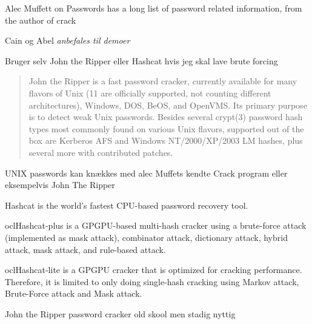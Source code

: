 \documentclass[Screen16to9,17pt]{foils}
\begin{document}
Alec Muffett on Passwords has a long list of password related information, from the author of crack 







\begin{list1}
\item Cain og Abel \emph{anbefales til demoer}  
\item Bruger selv John the Ripper eller Hashcat hvis jeg skal lave brute forcing
\end{list1}


\begin{quote}
John the Ripper is a fast password cracker, currently available for
many flavors of Unix (11 are officially supported, not counting
different architectures), Windows, DOS, BeOS, and OpenVMS. Its primary
purpose is to detect weak Unix passwords. Besides several crypt(3)
password hash types most commonly found on various Unix flavors,
supported out of the box are Kerberos AFS and Windows NT/2000/XP/2003
LM hashes, plus several more with contributed patches.
\end{quote}

\begin{list1}
\item UNIX passwords kan knækkes med alec Muffets kendte Crack program
  eller eksempelvis John The Ripper 
\end{list1}




\begin{list2}
\item Hashcat is the world's fastest CPU-based password recovery tool.
\item oclHashcat-plus is a GPGPU-based multi-hash cracker using a brute-force attack (implemented as mask attack), combinator attack, dictionary attack, hybrid attack, mask attack, and rule-based attack.
\item oclHashcat-lite is a GPGPU cracker that is optimized for cracking performance. Therefore, it is limited to only doing single-hash cracking using Markov attack, Brute-Force attack and Mask attack.
\item John the Ripper password cracker old skool men stadig nyttig
\end{list2}
\end{document}
